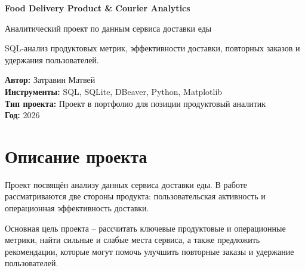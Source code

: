 \documentclass[12pt,a4paper]{article}
\begin{document}
\begin{titlepage}
    \centering

    \vspace*{2cm}

    {\Huge\bfseries\color{mainblue} Food Delivery Product \& Courier Analytics \par}

    \vspace{0.8cm}

    {\Large Аналитический проект по данным сервиса доставки еды \par}

    \vspace{1.5cm}

        \centering
        \large
        SQL-анализ продуктовых метрик, эффективности доставки, повторных заказов и удержания пользователей.

    \vfill

    \begin{flushleft}
        \large
        \textbf{Автор:} Затравин Матвей \\
        \textbf{Инструменты:} SQL, SQLite, DBeaver, Python, Matplotlib \\
        \textbf{Тип проекта:} Проект в портфолио для позиции продуктовый аналитик \\
        \textbf{Год:} 2026
    \end{flushleft}

    \vspace{1cm}

\end{titlepage}

\tableofcontents
\newpage

\section{Описание проекта}

Проект посвящён анализу данных сервиса доставки еды. В работе рассматриваются две стороны продукта: пользовательская активность и операционная эффективность доставки.

Основная цель проекта -- рассчитать ключевые продуктовые и операционные метрики, найти сильные и слабые места сервиса, а также предложить рекомендации, которые могут помочь улучшить повторные заказы и удержание пользователей.
\end{document}
